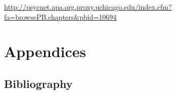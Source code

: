 \documentclass[reqno,12pt]{tufte-book}
\numberwithin{equation}{subsection}
\begin{document}
\url{http://psycnet.apa.org.proxy.uchicago.edu/index.cfm?fa=browsePB.chapters&pbid=10694}



\clearpage
\part{Appendices}
\appendix
\begin{appendices}
\chapter{Bibliography}


\end{appendices}
\end{document}
